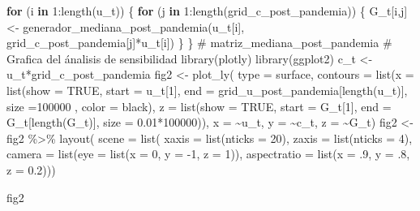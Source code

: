\documentclass[
  us-letterpaper,
]{scrreprt}
\newenvironment{Shaded}{\begin{snugshade}}{\end{snugshade}}
\newcommand{\AttributeTok}[1]{\textcolor[rgb]{0.40,0.45,0.13}{#1}}
\newcommand{\CommentTok}[1]{\textcolor[rgb]{0.37,0.37,0.37}{#1}}
\newcommand{\ConstantTok}[1]{\textcolor[rgb]{0.56,0.35,0.01}{#1}}
\newcommand{\ControlFlowTok}[1]{\textcolor[rgb]{0.00,0.23,0.31}{\textbf{#1}}}
\newcommand{\DecValTok}[1]{\textcolor[rgb]{0.68,0.00,0.00}{#1}}
\newcommand{\FloatTok}[1]{\textcolor[rgb]{0.68,0.00,0.00}{#1}}
\newcommand{\FunctionTok}[1]{\textcolor[rgb]{0.28,0.35,0.67}{#1}}
\newcommand{\NormalTok}[1]{\textcolor[rgb]{0.00,0.23,0.31}{#1}}
\newcommand{\OtherTok}[1]{\textcolor[rgb]{0.00,0.23,0.31}{#1}}
\newcommand{\SpecialCharTok}[1]{\textcolor[rgb]{0.37,0.37,0.37}{#1}}
\newcommand{\StringTok}[1]{\textcolor[rgb]{0.13,0.47,0.30}{#1}}
\theoremstyle{plain}
\theoremstyle{plain}
\theoremstyle{definition}
\theoremstyle{remark}
\begin{document}
\begin{Shaded}
\begin{Highlighting}[]
\ControlFlowTok{for}\NormalTok{ (i }\ControlFlowTok{in} \DecValTok{1}\SpecialCharTok{:}\FunctionTok{length}\NormalTok{(u\_t)) }
\NormalTok{\{}
  \ControlFlowTok{for}\NormalTok{ (j }\ControlFlowTok{in} \DecValTok{1}\SpecialCharTok{:}\FunctionTok{length}\NormalTok{(grid\_c\_post\_pandemia)) }
\NormalTok{  \{}
\NormalTok{    G\_t[i,j] }\OtherTok{\textless{}{-}} \FunctionTok{generador\_mediana\_post\_pandemia}\NormalTok{(u\_t[i], }
\NormalTok{                                  grid\_c\_post\_pandemia[j]}\SpecialCharTok{*}\NormalTok{u\_t[i])}
\NormalTok{  \}}
\NormalTok{\}  }
\CommentTok{\# matriz\_mediana\_post\_pandemia  }
\CommentTok{\# Grafica del ánalisis de sensibilidad}
\FunctionTok{library}\NormalTok{(plotly)}
\FunctionTok{library}\NormalTok{(ggplot2)}
\NormalTok{c\_t }\OtherTok{\textless{}{-}}\NormalTok{ u\_t}\SpecialCharTok{*}\NormalTok{grid\_c\_post\_pandemia}
\NormalTok{fig2 }\OtherTok{\textless{}{-}} \FunctionTok{plot\_ly}\NormalTok{(}
  \AttributeTok{type =} \StringTok{\textquotesingle{}surface\textquotesingle{}}\NormalTok{,}
  \AttributeTok{contours =} \FunctionTok{list}\NormalTok{(}\AttributeTok{x =} \FunctionTok{list}\NormalTok{(}\AttributeTok{show =} \ConstantTok{TRUE}\NormalTok{, }\AttributeTok{start =}\NormalTok{ u\_t[}\DecValTok{1}\NormalTok{], }
                  \AttributeTok{end =}\NormalTok{ grid\_u\_post\_pandemia[}\FunctionTok{length}\NormalTok{(u\_t)], }
                  \AttributeTok{size =}\DecValTok{100000}\NormalTok{ , }\AttributeTok{color =} \StringTok{\textquotesingle{}black\textquotesingle{}}\NormalTok{),}
                  \AttributeTok{z =} \FunctionTok{list}\NormalTok{(}\AttributeTok{show =} \ConstantTok{TRUE}\NormalTok{, }\AttributeTok{start =}\NormalTok{ G\_t[}\DecValTok{1}\NormalTok{], }
                  \AttributeTok{end =}\NormalTok{ G\_t[}\FunctionTok{length}\NormalTok{(G\_t)], }
                  \AttributeTok{size =} \FloatTok{0.01}\SpecialCharTok{*}\DecValTok{100000}\NormalTok{)),}
  \AttributeTok{x =} \SpecialCharTok{\textasciitilde{}}\NormalTok{u\_t,}
  \AttributeTok{y =} \SpecialCharTok{\textasciitilde{}}\NormalTok{c\_t,}
  \AttributeTok{z =} \SpecialCharTok{\textasciitilde{}}\NormalTok{G\_t)}
\NormalTok{fig2 }\OtherTok{\textless{}{-}}\NormalTok{ fig2 }\SpecialCharTok{\%\textgreater{}\%} \FunctionTok{layout}\NormalTok{(}
    \AttributeTok{scene =} \FunctionTok{list}\NormalTok{(}
    \AttributeTok{xaxis =} \FunctionTok{list}\NormalTok{(}\AttributeTok{nticks =} \DecValTok{20}\NormalTok{),}
    \AttributeTok{zaxis =} \FunctionTok{list}\NormalTok{(}\AttributeTok{nticks =} \DecValTok{4}\NormalTok{),}
    \AttributeTok{camera =} \FunctionTok{list}\NormalTok{(}\AttributeTok{eye =} \FunctionTok{list}\NormalTok{(}\AttributeTok{x =} \DecValTok{0}\NormalTok{, }
                             \AttributeTok{y =} \SpecialCharTok{{-}}\DecValTok{1}\NormalTok{, }
                             \AttributeTok{z =} \DecValTok{1}\NormalTok{)),}
    \AttributeTok{aspectratio =} \FunctionTok{list}\NormalTok{(}\AttributeTok{x =}\NormalTok{ .}\DecValTok{9}\NormalTok{, }\AttributeTok{y =}\NormalTok{ .}\DecValTok{8}\NormalTok{, }\AttributeTok{z =} \FloatTok{0.2}\NormalTok{)))}

\NormalTok{fig2}
\end{Highlighting}
\end{Shaded}
\end{document}

